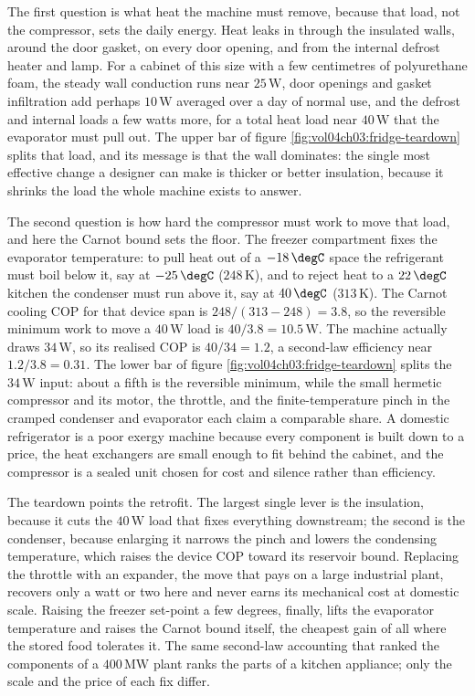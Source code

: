 The first question is what heat the machine must remove, because that load,
not the compressor, sets the daily energy. Heat leaks in through the insulated
walls, around the door gasket, on every door opening, and from the internal
defrost heater and lamp. For a cabinet of this size with a few centimetres of
polyurethane foam, the steady wall conduction runs near $25\,\text{W}$, door
openings and gasket infiltration add perhaps $10\,\text{W}$ averaged over a
day of normal use, and the defrost and internal loads a few watts more, for a
total heat load near $40\,\text{W}$ that the evaporator must pull out. The
upper bar of figure \ref{fig:vol04ch03:fridge-teardown} splits that load, and
its message is that the wall dominates: the single most effective change a
designer can make is thicker or better insulation, because it shrinks the load
the whole machine exists to answer.

The second question is how hard the compressor must work to move that load,
and here the Carnot bound sets the floor. The freezer compartment fixes the
evaporator temperature: to pull heat out of a $-18\,\degC$ space the
refrigerant must boil below it, say at $-25\,\degC$ ($248\,\si{\kelvin}$),
and to reject heat to a $22\,\degC$ kitchen the condenser must run above it,
say at $40\,\degC$ ($313\,\si{\kelvin}$). The Carnot cooling COP for that
device span is $248/(313 - 248) = 3.8$, so the reversible minimum work to move
a $40\,\text{W}$ load is $40/3.8 = 10.5\,\text{W}$. The machine actually draws
$34\,\text{W}$, so its realised COP is $40/34 = 1.2$, a second-law efficiency
near $1.2/3.8 = 0.31$. The lower bar of figure
\ref{fig:vol04ch03:fridge-teardown} splits the $34\,\text{W}$ input: about a
fifth is the reversible minimum, while the small hermetic compressor and its
motor, the throttle, and the finite-temperature pinch in the cramped condenser
and evaporator each claim a comparable share. A domestic refrigerator is a
poor exergy machine because every component is built down to a price, the
heat exchangers are small enough to fit behind the cabinet, and the compressor
is a sealed unit chosen for cost and silence rather than efficiency.

The teardown points the retrofit. The largest single lever is the insulation,
because it cuts the $40\,\text{W}$ load that fixes everything downstream; the
second is the condenser, because enlarging it narrows the pinch and lowers the
condensing temperature, which raises the device COP toward its reservoir
bound. Replacing the throttle with an expander, the move that pays on a large
industrial plant, recovers only a watt or two here and never earns its
mechanical cost at domestic scale. Raising the freezer set-point a few degrees,
finally, lifts the evaporator temperature and raises the Carnot bound itself,
the cheapest gain of all where the stored food tolerates it. The same
second-law accounting that ranked the components of a $400\,\text{MW}$ plant
ranks the parts of a kitchen appliance; only the scale and the price of each
fix differ.

